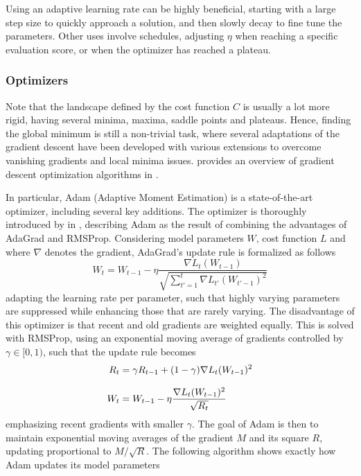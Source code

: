         Using an adaptive learning rate can be highly beneficial, starting with a large step size to quickly approach a solution, and then slowly decay to fine tune the parameters. Other uses involve schedules, adjusting $\eta$ when reaching a specific evaluation score, or when the optimizer has reached a plateau.
    
    \subsubsection{Optimizers}
    
        Note that the landscape defined by the cost function $C$ is usually a lot more rigid, having several minima, maxima, saddle points and plateaus. Hence, finding the global minimum is still a non-trivial task, where several adaptations of the gradient descent have been developed with various extensions to overcome vanishing gradients and local minima issues. 
        \citeauthor{ruder2017overview} provides an overview of gradient descent optimization algorithms in \cite{ruder2017overview}.
        
        In particular, Adam (Adaptive Moment Estimation) is a state-of-the-art optimizer, including several key additions. The optimizer is thoroughly introduced by \citeauthor{kingma2017adam} in \cite{kingma2017adam}, describing Adam as the result of combining the advantages of AdaGrad and RMSProp. Considering model parameters $W$, cost function $L$ and where $\nabla$ denotes the gradient, AdaGrad's update rule is formalized as follows
        \begin{equation}
            W_t = W_{t-1} - \eta \frac{\nabla L_t(W_{t-1})}{\sqrt{\sum_{t'=1}^t\nabla L_{t'}(W_{t'-1})^2}}
        \end{equation}
        adapting the learning rate per parameter, such that highly varying parameters are suppressed while enhancing those that are rarely varying. The disadvantage of this optimizer is that recent and old gradients are weighted equally. This is solved with RMSProp, using an exponential moving average of gradients controlled by $\gamma \in [0,1)$, such that the update rule becomes
        \begin{align}
            R_t &= \gamma R_{t-1}+(1-\gamma)\nabla L_t(W_{t-1})^2 \\[.5\baselineskip]
            W_t &= W_{t-1} - \eta \frac{\nabla L_t(W_{t-1})^2}{\sqrt{R_t}}
        \end{align}
        emphasizing recent gradients with smaller $\gamma$. The goal of Adam is then to maintain exponential moving averages of the gradient $M$ and its square $R$, updating proportional to $M / \sqrt{R}$. The following algorithm shows exactly how Adam updates its model parameters
        
